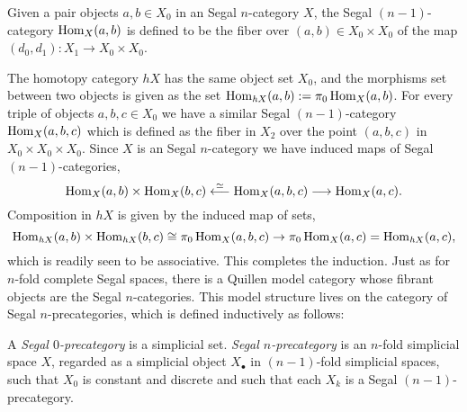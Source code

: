\documentclass{amsart}
\begin{document}
Given a pair objects $a,b \in X_0$ in an  Segal $n$-category $X$, the  Segal $(n-1)$-category $\operatorname{Hom}_X(a,b)$ is defined to be the fiber over $(a,b) \in X_0 \times X_0$ of the map $(d_0, d_1): X_1 \to X_0 \times X_0$.  
\begin{center}
\end{center}
The homotopy category $\mathit{h}X$ has the same object set $X_0$, and the morphisms set between two objects is given as the set $\operatorname{Hom}_{\mathit{h}X}(a,b) := \pi_0 \operatorname{Hom}_X(a,b)$. For every triple of objects $a,b,c \in X_0$ we have a similar  Segal $(n-1)$-category $\operatorname{Hom}_X(a,b,c)$ which is defined as the fiber in $X_2$ over the point $(a,b,c)$ in $X_0 \times X_0 \times X_0$. Since $X$ is an  Segal $n$-category we have induced maps of  Segal $(n-1)$-categories,
\begin{equation*}
	\operatorname{Hom}_X(a,b) \times \operatorname{Hom}_X(b,c) \stackrel{\simeq}{\longleftarrow} \operatorname{Hom}_X(a,b,c) \stackrel{}{\longrightarrow} \operatorname{Hom}_X(a,c).
\end{equation*}
Composition in $\mathit{h}X$ is given by the induced map of sets,
\begin{equation*}
	 \operatorname{Hom}_{\mathit{h}X}(a,b) \times \operatorname{Hom}_{\mathit{h}X}(b,c) \cong \pi_0 \operatorname{Hom}_X(a,b,c)\to \pi_0 \operatorname{Hom}_X(a,c) = \operatorname{Hom}_{\mathit{h}X}(a,c),
\end{equation*}
which is readily seen to be associative. This completes the induction. Just as for $n$-fold complete Segal spaces, there is a Quillen model category whose fibrant objects are the Segal $n$-categories. This model structure lives on the category of Segal $n$-precategories, which is defined inductively as follows:

\begin{definition}
	A {\em Segal $0$-precategory} is a simplicial set. {\em Segal $n$-precategory} is an $n$-fold simplicial space $X$, regarded as a simplicial object $X_\bullet$ in $(n-1)$-fold simplicial spaces, such that $X_0$ is constant and discrete and such that each $X_k$ is a  Segal $(n-1)$-precategory. 
\end{definition}
\end{document}
